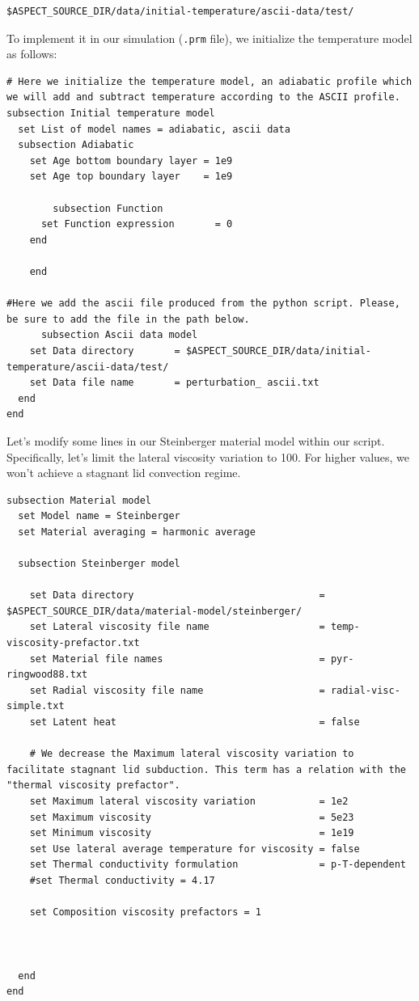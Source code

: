\documentclass{article}
\begin{document}
\begin{verbatim}
$ASPECT_SOURCE_DIR/data/initial-temperature/ascii-data/test/
\end{verbatim}

To implement it in our simulation (\texttt{.prm} file), we initialize the temperature model as follows:

\begin{verbatim}
# Here we initialize the temperature model, an adiabatic profile which we will add and subtract temperature according to the ASCII profile.
subsection Initial temperature model
  set List of model names = adiabatic, ascii data
  subsection Adiabatic
    set Age bottom boundary layer = 1e9
    set Age top boundary layer    = 1e9
    
        subsection Function
      set Function expression       = 0
    end

    end

#Here we add the ascii file produced from the python script. Please, be sure to add the file in the path below.
      subsection Ascii data model
    set Data directory       = $ASPECT_SOURCE_DIR/data/initial-temperature/ascii-data/test/
    set Data file name       = perturbation_ ascii.txt
  end
end
\end{verbatim}

Let's modify some lines in our Steinberger material model within our script. Specifically, let's limit the lateral viscosity variation to 100. For higher values, we won't achieve a stagnant lid convection regime.

\begin{verbatim}
subsection Material model
  set Model name = Steinberger
  set Material averaging = harmonic average
  
  subsection Steinberger model

    set Data directory                                = $ASPECT_SOURCE_DIR/data/material-model/steinberger/
    set Lateral viscosity file name                   = temp-viscosity-prefactor.txt
    set Material file names                           = pyr-ringwood88.txt    
    set Radial viscosity file name                    = radial-visc-simple.txt
    set Latent heat                                   = false
    
    # We decrease the Maximum lateral viscosity variation to facilitate stagnant lid subduction. This term has a relation with the "thermal viscosity prefactor".
    set Maximum lateral viscosity variation           = 1e2 
    set Maximum viscosity                             = 5e23
    set Minimum viscosity                             = 1e19
    set Use lateral average temperature for viscosity = false
    set Thermal conductivity formulation              = p-T-dependent
    #set Thermal conductivity = 4.17
    
    set Composition viscosity prefactors = 1


    
  end
end
\end{verbatim}
\end{document}
